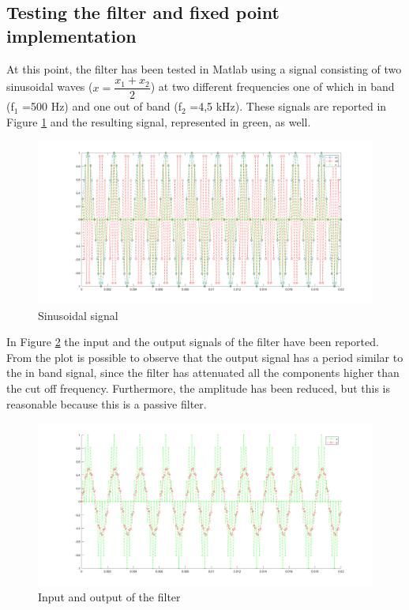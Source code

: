\documentclass[a4paper, titlepage]{article}
\begin{document}
\subsection{Testing the filter and fixed point implementation}
At this point, the filter has been tested in Matlab using a signal consisting of two sinusoidal waves ($x=\dfrac{x_1+x_2}{2}$) at two different frequencies one of which in band (f$_1$ =500 Hz) and one out of band (f$_2$ =4,5 kHz). These signals are reported in Figure \ref{fig:sine_wave} and the resulting signal, represented in green, as well.
 \begin{figure} [h]
\centering
	\includegraphics[scale=0.25]{inputs.png}
	\caption{Sinusoidal signal}
	\label{fig:sine_wave}
\end{figure}
\noindent 
In Figure \ref{fig:x_y_filter} the input and the output signals of the filter have been reported. From the plot is possible to observe that the output signal has a period similar to the in band signal, since the filter has attenuated all the components higher than the cut off frequency. Furthermore, the amplitude has been reduced, but this is reasonable because this is a passive filter.
 \begin{figure} [h]
\centering
	\includegraphics[scale=0.25]{y_x_filter.png}
	\caption{Input and output of the filter}
	\label{fig:x_y_filter}
\end{figure}
\end{document}
